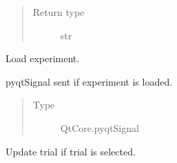\documentclass[letterpaper,10pt,english]{sphinxmanual}
\begin{document}
\begin{fulllineitems}
\begin{fulllineitems}
\begin{quote}
\begin{description}
\item[{Return type}] \leavevmode
\sphinxAtStartPar
str

\end{description}\end{quote}

\end{fulllineitems}


\begin{fulllineitems}
\label{\detokenize{NoSeMazeControl/main:main.MainApp.load_experiment}}
\pysigstartsignatures
{}
\pysigstopsignatures
\sphinxAtStartPar
Load experiment.

\end{fulllineitems}


\begin{fulllineitems}
\label{\detokenize{NoSeMazeControl/main:main.MainApp.loaded}}
\pysigstartsignatures
{}
\pysigstopsignatures
\sphinxAtStartPar
pyqtSignal sent if experiment is loaded.
\begin{quote}\begin{description}
\item[{Type}] \leavevmode
\sphinxAtStartPar
QtCore.pyqtSignal

\end{description}\end{quote}

\end{fulllineitems}


\begin{fulllineitems}
\label{\detokenize{NoSeMazeControl/main:main.MainApp.on_trial_selected}}
\pysigstartsignatures
{}
\pysigstopsignatures
\sphinxAtStartPar
Update trial if trial is selected.

\end{fulllineitems}



\end{fulllineitems}
\end{document}
